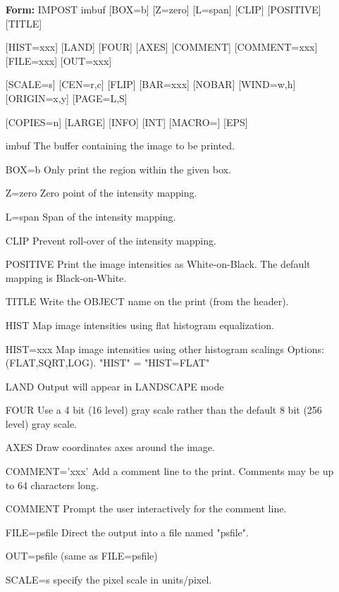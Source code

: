 \begin{itemize}
  \item[\textbf{Form: } IMPOST imbuf {[BOX=b]} {[Z=zero]} {[L=span]} {[CLIP]} 
       {[POSITIVE]} {[TITLE]}\hfill]{}
  \item[{[HIST=xxx]} {[LAND]} {[FOUR]} {[AXES]} {[COMMENT]} {[COMMENT=xxx]}
        {[FILE=xxx]} {[OUT=xxx]}]{}
  \item[{[SCALE=s]} {[CEN=r,c]} {[FLIP]} {[BAR=xxx]} {[NOBAR]} {[WIND=w,h]} 
        {[ORIGIN=x,y]} {[PAGE=L,S]}]{}
  \item[{[COPIES=n]} {[LARGE]} {[INFO]} {[INT]} {[MACRO=]} {[EPS]}]{}
  \item[imbuf]{The buffer containing the image to be printed.}
  \item[BOX=b]{Only print the region within the given box.}
  \item[Z=zero ]{Zero point of the intensity mapping.}
  \item[L=span ]{Span of the intensity mapping.  }
  \item[CLIP]{Prevent roll-over of the intensity mapping.}
  \item[POSITIVE ]{Print the image intensities as White-on-Black.
                   The default mapping is Black-on-White.}
  \item[TITLE ]{Write the OBJECT name on the print (from the header).}
  \item[HIST ]{Map image intensities using flat histogram equalization.}
  \item[HIST=xxx]{Map image intensities using other histogram scalings
                  Options: (FLAT,SQRT,LOG).  "HIST" = "HIST=FLAT"}
  \item[LAND ]{Output will appear in LANDSCAPE mode}
  \item[FOUR ]{Use a 4 bit (16 level) gray scale rather than the
               default 8 bit (256 level) gray scale.}
  \item[AXES ]{Draw coordinates axes around the image.}
  \item[COMMENT='xxx']{Add a comment line to the print.  Comments may be
                       up to 64 characters long. }
  \item[COMMENT ]{Prompt the user interactively for the comment line.}
  \item[FILE=psfile]{Direct the output into a file named "psfile".}
  \item[OUT=psfile]{(same as FILE=psfile)}
  \item[SCALE=s ]{specify the pixel scale in units/pixel.}

\end{itemize}
